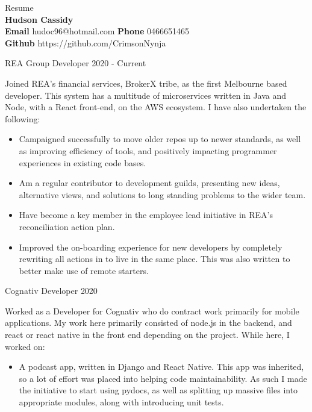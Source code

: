 \documentclass[8pt]{developercv}
\begin{document}
	\begin{minipage}[a]{1.0\textwidth}
		\begin{center}	%
			{\HUGE Resume}\\
			\textbf {Hudson Cassidy} \\
			\textbf {Email} hudoc96@hotmail.com
			\textbf {Phone} 0466651465 \\
			\textbf {Github} https://github.com/CrimsonNynja \\
		\end{center}
	\end{minipage}
	\begin{minipage}[t]{0.7\textwidth}
		\begin{entrylist}	%
			\entry
				{REA Group}
				{Developer}
				{2020 - Current}
				{Joined REA's financial services, BrokerX tribe, as the first Melbourne based developer. This system has a multitude of microservices written in Java and Node, with a React front-end, on the AWS ecosystem. I have also undertaken the following:
				\begin{itemize}
					\item Campaigned successfully to move older repos up to newer standards, as well as improving efficiency of tools, and positively impacting programmer experiences in existing code bases.
					\item Am a regular contributor to development guilds, presenting new ideas, alternative views, and solutions to long standing problems to the wider team.
					\item Have become a key member in the employee lead initiative in REA's reconciliation action plan.
					\item Improved the on-boarding experience for new developers by completely rewriting all actions in to live in the same place. This was also written to better make use of remote starters.
				\end{itemize}
				}
			\entry
				{Cognativ}
				{Developer}
				{2020}
				{Worked as a Developer for Cognativ who do contract work primarily for mobile applications. My work here primarily consisted of node.js in the backend, and react or react native in the front end depending on the project.
				While here, I worked on:
				\begin{itemize}
					\item A podcast app, written in Django and React Native. This app was inherited, so a lot of effort was placed into helping code maintainability. As such I made the initiative to start using pydocs, as well as splitting up massive files into appropriate modules, along with introducing unit tests.

\end{itemize}}
\end{entrylist}
\end{minipage}
\end{document}
